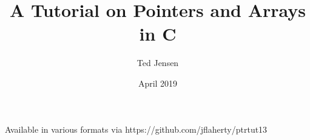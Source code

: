 \documentclass[12pt, letterpaper]{article}
\title{A Tutorial on Pointers and Arrays in C}
\author{Ted Jensen}
\date{April 2019}
\begin{document}
\maketitle

Available in various formats via https://github.com/jflaherty/ptrtut13\\

\tableofcontents
\newpage


\newpage


\newpage


\newpage


\newpage


\newpage


\newpage


\newpage


\newpage


\newpage


\newpage


\newpage

\end{document}
